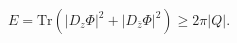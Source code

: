 \begin{equation}
E=\mathrm{Tr}\left( \left| D_{z}\Phi\right| ^{2}+\left| D_{\bar{z}}%
\Phi\right| ^{2}\right) \geq2\pi\left| Q\right| . \label{E1}%
\end{equation}

